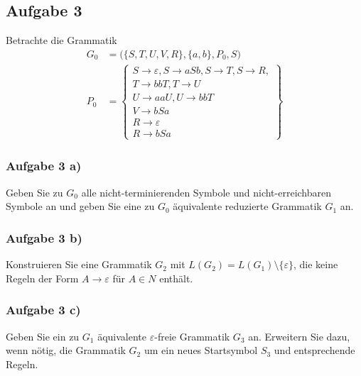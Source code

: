 \subsection{Aufgabe 3}
Betrachte die Grammatik
\begin{align*}
	G_0&=\Big(\lbrace S,T,U,V,R\rbrace,\lbrace a,b\rbrace,P_0,S\Big)\\
	P_0&=\left\lbrace
		\begin{array}{c}
			 S\to\varepsilon,S\to aSb,S\to T,S\to R,\\
			 T\to bbT, T\to U\\
			 U\to aa U,U\to bbT\\
			 V\to bSa\\
			 R\to\varepsilon\\
			 R\to bSa
		\end{array}\right\rbrace		
\end{align*}
	
\subsubsection{Aufgabe 3 a)}
Geben Sie zu $G_0$ alle nicht-terminierenden Symbole und nicht-erreichbaren Symbole an und geben Sie eine zu $G_0$ äquivalente reduzierte Grammatik $G_1$ an.

\begin{lösung}
\end{lösung}

\subsubsection{Aufgabe 3 b)}
Konstruieren Sie eine Grammatik $G_2$ mit $L(G_2)=L(G_1)\setminus\lbrace\varepsilon\rbrace$, die keine Regeln der Form $A\to\varepsilon$ für $A\in N$ enthält.

\begin{lösung}
\end{lösung}

\subsubsection{Aufgabe 3 c)}
Geben Sie ein zu $G_1$ äquivalente $\varepsilon$-freie Grammatik $G_3$ an.
Erweitern Sie dazu, wenn nötig, die Grammatik $G_2$ um ein neues Startsymbol $S_3$ und entsprechende Regeln.

\begin{lösung}
\end{lösung}

